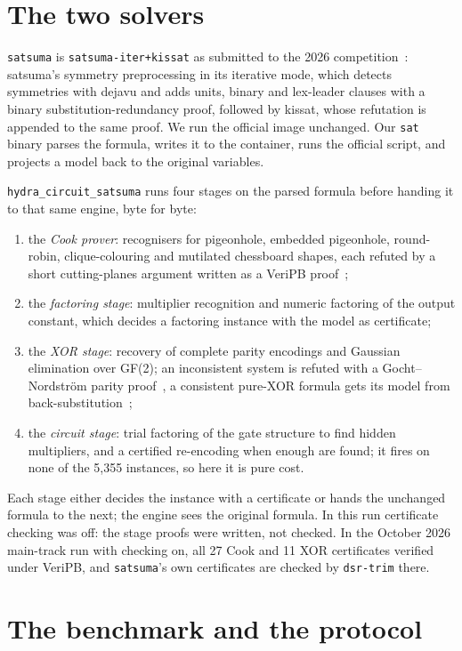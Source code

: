 \documentclass[10pt]{article}
\newcommand{\hcs}{\texttt{hydra\_circuit\_satsuma}}
\newcommand{\sats}{\texttt{satsuma}}
\begin{document}
\section{The two solvers}

\sats{} is \texttt{satsuma-iter+kissat} as submitted to the 2026
competition~\cite{sbr}: satsuma's symmetry preprocessing in its iterative
mode, which detects symmetries with dejavu and adds units, binary and
lex-leader clauses with a binary substitution-redundancy proof, followed
by kissat, whose refutation is appended to the same proof. We run the
official image unchanged. Our \texttt{sat} binary parses the formula,
writes it to the container, runs the official script, and projects a model
back to the original variables.

\hcs{} runs four stages on the parsed formula before handing it to that
same engine, byte for byte:
\begin{enumerate}
\item the \emph{Cook prover}: recognisers for pigeonhole, embedded
  pigeonhole, round-robin, clique-colouring and mutilated chessboard
  shapes, each refuted by a short cutting-planes argument written as a
  VeriPB proof~\cite{cook76,haken85};
\item the \emph{factoring stage}: multiplier recognition and numeric
  factoring of the output constant, which decides a factoring instance
  with the model as certificate;
\item the \emph{XOR stage}: recovery of complete parity encodings and
  Gaussian elimination over GF(2); an inconsistent system is refuted with
  a Gocht--Nordstr\"om parity proof~\cite{gn21}, a consistent pure-XOR
  formula gets its model from back-substitution~\cite{tseitin68,urquhart87,soos09};
\item the \emph{circuit stage}: trial factoring of the gate structure to
  find hidden multipliers, and a certified re-encoding when enough are
  found; it fires on none of the 5,355 instances, so here it is pure cost.
\end{enumerate}
Each stage either decides the instance with a certificate or hands the
unchanged formula to the next; the engine sees the original formula. In
this run certificate checking was off: the stage proofs were written, not
checked. In the October 2026 main-track run with checking on, all 27 Cook
and 11 XOR certificates verified under VeriPB, and \sats{}'s own
certificates are checked by \texttt{dsr-trim} there.

\section{The benchmark and the protocol}
\end{document}
